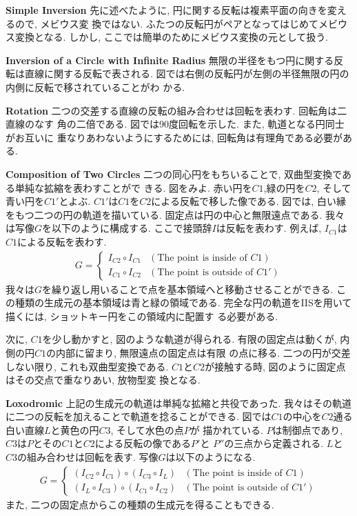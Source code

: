 \noindent\textbf{Simple Inversion}
先に述べたように, 円に関する反転は複素平面の向きを変えるので, メビウス変
換ではない.
ふたつの反転円がペアとなってはじめてメビウス変換となる.
しかし, ここでは簡単のためにメビウス変換の元として扱う.

\noindent\textbf{Inversion of a Circle with Infinite Radius}
無限の半径をもつ円に関する反転は直線に関する反転で表される.
図では右側の反転円が左側の半径無限の円の内側に反転で移されていることがわ
かる.

\noindent\textbf{Rotation}
二つの交差する直線の反転の組み合わせは回転を表わす. 回転角は二直線のなす
角の二倍である. 図では90度回転を示した. また, 軌道となる円同士がお互いに
重なりあわないようにするためには, 回転角は有理角である必要がある.

\noindent\textbf{Composition of Two Circles}
二つの同心円をもちいることで, 双曲型変換である単純な拡縮を表わすことがで
きる.
図をみよ.
赤い円を$C1$,緑の円を$C2$, そして青い円を$C1'$とよぶ.
$C1'$は$C1$を$C2$による反転で移した像である.
図では, 白い縁をもつ二つの円の軌道を描いている.
固定点は円の中心と無限遠点である.
我々は写像$G$を以下のように構成する.
ここで接頭辞$I$は反転を表わす.
例えば, $I_{C1}$は$C1$による反転を表わす.
\begin{align*}
 G =
  \begin{cases}
   I_{C2} \circ I_{C1} & (\text{The point is inside of } C1) \\
   I_{C1} \circ I_{C2} & (\text{The point is outside of }C1')
  \end{cases}
\end{align*}
我々は$G$を繰り返し用いることで点を基本領域へと移動させることができる.
この種類の生成元の基本領域は青と緑の領域である.
完全な円の軌道をIISを用いて描くには, ショットキー円をこの領域内に配置す
る必要がある.

次に, $C1$を少し動かすと, 図のような軌道が得られる.
有限の固定点は動くが, 内側の円$C1$の内部に留まり, 無限遠点の固定点は有限
の点に移る.
二つの円が交差しない限り, これも双曲型変換である.
$C1$と$C2$が接触する時, 図のように固定点はその交点で重なりあい, 放物型変
換となる.

\noindent\textbf{Loxodromic}
上記の生成元の軌道は単純な拡縮と共役であった.
我々はその軌道に二つの反転を加えることで軌道を捻ることができる.
図では$C1$の中心を$C2$通る白い直線$L$と黄色の円$C3$, そして水色の点$P$が
描かれている.
$P$は制御点であり, $C3$は$P$とその$C1$と$C2$による反転の像である$P'$と
$P''$の三点から定義される.
$L$と$C3$の組み合わせは回転を表す.
写像$G$は以下のようになる.
\begin{align*}
G =
\begin{cases}
 (I_{C2} \circ I_{C1}) \circ (I_{C3} \circ I_L) & (\text{The point is inside of } C1) \\
 (I_L \circ I_{C3}) \circ (I_{C1} \circ I_{C2}) & (\text{The point is outside of }C1')
\end{cases}
\end{align*}
また, 二つの固定点からこの種類の生成元を得ることもできる.

